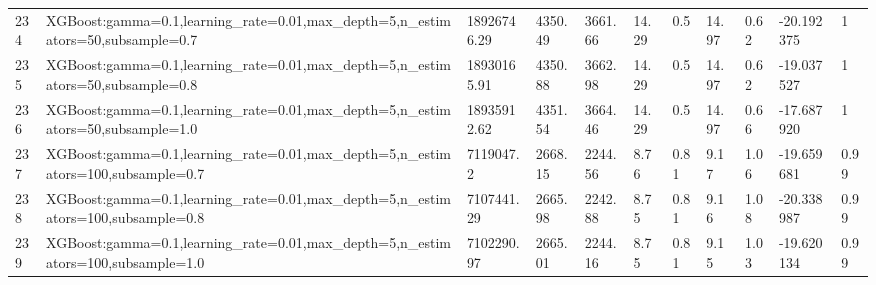 \begin{longtable}{C{0.8cm} L{2cm} C{1.15cm} C{1.15cm} C{1.15cm} C{1.15cm} C{0.85cm} C{1.25cm} C{1.2cm} C{1.5cm} C{1.0cm}}
234 & XGBoost:\newline gamma=0.1,\newline learning\_rate=0.01,\newline max\_depth=5,\newline n\_estimators=50,\newline subsample=0.7 & 18926746.29 & 4350.49 & 3661.66 & 14.29 & 0.5 & 14.97 & 0.62 & -20.192375 & 1 \\
235 & XGBoost:\newline gamma=0.1,\newline learning\_rate=0.01,\newline max\_depth=5,\newline n\_estimators=50,\newline subsample=0.8 & 18930165.91 & 4350.88 & 3662.98 & 14.29 & 0.5 & 14.97 & 0.62 & -19.037527 & 1 \\
236 & XGBoost:\newline gamma=0.1,\newline learning\_rate=0.01,\newline max\_depth=5,\newline n\_estimators=50,\newline subsample=1.0 & 18935912.62 & 4351.54 & 3664.46 & 14.29 & 0.5 & 14.97 & 0.66 & -17.687920 & 1 \\
237 & XGBoost:\newline gamma=0.1,\newline learning\_rate=0.01,\newline max\_depth=5,\newline n\_estimators=100,\newline subsample=0.7 & 7119047.2 & 2668.15 & 2244.56 & 8.76 & 0.81 & 9.17 & 1.06 & -19.659681 & 0.99 \\
238 & XGBoost:\newline gamma=0.1,\newline learning\_rate=0.01,\newline max\_depth=5,\newline n\_estimators=100,\newline subsample=0.8 & 7107441.29 & 2665.98 & 2242.88 & 8.75 & 0.81 & 9.16 & 1.08 & -20.338987 & 0.99 \\
239 & XGBoost:\newline gamma=0.1,\newline learning\_rate=0.01,\newline max\_depth=5,\newline n\_estimators=100,\newline subsample=1.0 & 7102290.97 & 2665.01 & 2244.16 & 8.75 & 0.81 & 9.15 & 1.03 & -19.620134 & 0.99 \\

\end{longtable}
